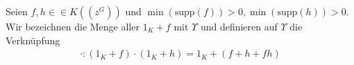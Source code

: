 \begin{defn}
Seien $f, h\in \in K\left(\left(z^{G}\right)\right)$ und $\min(\text{supp}(f)) >0, \min(\text{supp}(h)) >0$. Wir bezeichnen die Menge aller $1_K + f$ mit $\Upsilon$ und definieren auf $\Upsilon$ die Verknüpfung
\begin{eqnarray*}
\cdot\colon \left(1_K + f\right) \cdot \left(1_K + h\right) = 1_K + \left(f+h+fh\right)
\end{eqnarray*} 
\end{defn}
%
%
%
%
%
%

